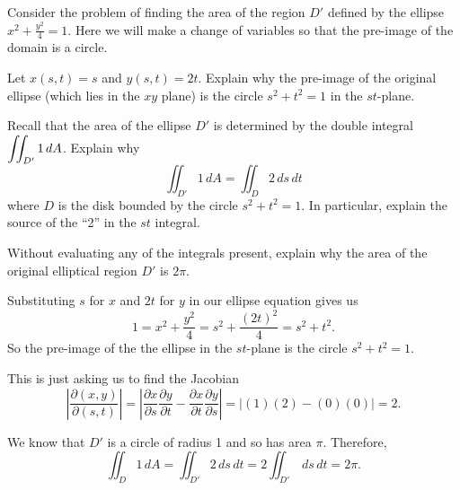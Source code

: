 \begin{activity} \label{A:11.9.3} Consider the problem of finding the area of the region $D'$ defined by the ellipse $x^2 + \frac{y^2}{4} = 1$. Here we will make a change of variables so that the pre-image of the domain is a circle.
	\ba
	\item Let $x(s,t) = s$ and $y(s,t) = 2t$. Explain why the pre-image of the original ellipse (which lies in the $xy$ plane)   is the circle $s^2 + t^2 = 1$ in the $st$-plane.
	
	\item Recall that the area of the ellipse $D'$ is determined by the double integral $\displaystyle \iint_{D'} 1 \, dA$. Explain why
	\[\iint_{D'} 1 \, dA = \iint_{D} 2 \, ds \, dt\]
	where $D$ is the disk bounded by the circle $s^2 + t^2 = 1$.  In particular, explain the source of the ``2'' in the $st$ integral.
	
	\item Without evaluating any of the integrals present, explain why the area of the original elliptical region $D'$ is $2\pi$.

	

	\ea

\end{activity}
\begin{smallhint}

\end{smallhint}
\begin{bighint}

\end{bighint}
\begin{activitySolution}
	\ba
	\item Substituting $s$ for $x$ and $2t$ for $y$ in our ellipse equation gives us
\[1 = x^2 + \frac{y^2}{4} = s^2 + \frac{(2t)^2}{4} = s^2 + t^2.\]
So the pre-image of the the ellipse in the $st$-plane is the circle $s^2 + t^2 = 1$.
	
	\item This is just asking us to find the Jacobian
\[\left|\frac{\partial(x,y)}{\partial(s,t)}\right| = \left|\frac{\partial x}{\partial s} \frac{\partial y}{\partial t} - \frac{\partial x}{\partial t} \frac{\partial y}{\partial s}\right| = |(1)(2) - (0)(0)| = 2.\]
	
	\item We know that $D'$ is a circle of radius 1 and so has area $\pi$. Therefore, 
\[\iint_D 1 \, dA = \iint_{D'} 2 \, ds \, dt = 2\iint_{D'}  \, ds \, dt = 2\pi.\]

	\ea
\end{activitySolution}
\aftera
